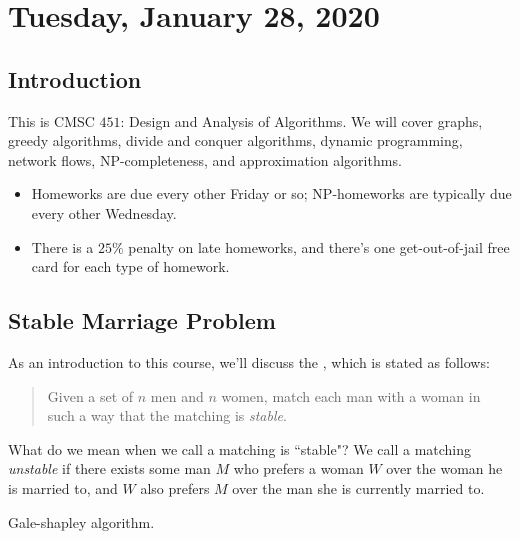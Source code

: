 \section{Tuesday, January 28, 2020}

\subsection{Introduction}

This is CMSC $451$: Design and Analysis of Algorithms. We will cover graphs, greedy algorithms, divide and conquer algorithms, dynamic programming, network flows, NP-completeness, and approximation algorithms.


\begin{itemize}
    \item Homeworks are due every other Friday or so; NP-homeworks are typically due every other Wednesday.
    \item There is a $25\%$ penalty on late homeworks, and there's one get-out-of-jail free card for each type of homework.
\end{itemize}

\subsection{Stable Marriage Problem}

As an introduction to this course, we'll discuss the , which is stated as follows:

\begin{quote}
    Given a set of $n$ men and $n$ women, match each man with a woman in such a way that the matching is \textit{stable}.
\end{quote}

What do we mean when we call a matching is ``stable"? We call a matching \textit{unstable} if there exists some man $M$ who prefers a woman $W$ over the woman he is married to, and $W$ also prefers $M$ over the man she is currently married to.



Gale-shapley algorithm.